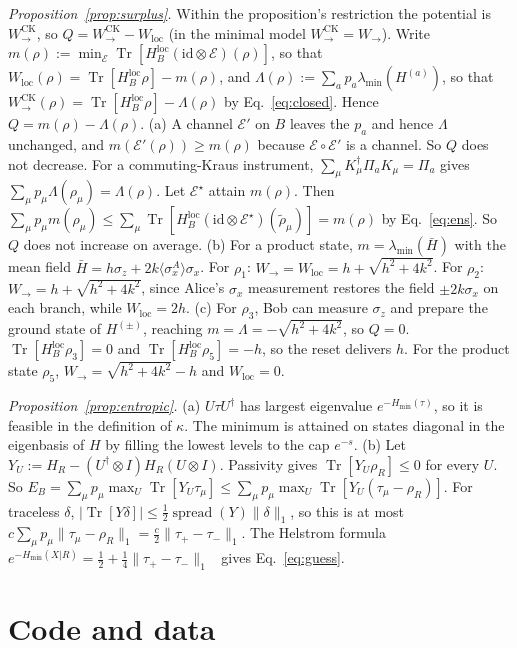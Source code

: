 \documentclass[aps,pra,twocolumn,reprint,superscriptaddress,nofootinbib,floatfix]{revtex4-2}
\theoremstyle{plain}
\theoremstyle{remark}
\newcommand{\Tr}{\operatorname{Tr}}
\newcommand{\id}{\mathrm{id}}
\newcommand{\Wto}{W_{\to}}
\newcommand{\WCK}{W_{\to}^{\mathrm{CK}}}
\newcommand{\Wloc}{W_{\mathrm{loc}}}
\newcommand{\HBl}{H_B^{\mathrm{loc}}}
\newcommand{\E}{\mathcal{E}}
\newcommand{\lmin}{\lambda_{\min}}
\newcommand{\Hmin}{H_{\min}}
\newcommand{\spread}{\operatorname{spread}}
\begin{document}
\emph{Proposition~\ref{prop:surplus}.} Within the proposition's restriction the potential is
$\WCK$, so $Q=\WCK-\Wloc$ (in the minimal model $\WCK=\Wto$). Write
$m(\rho):=\min_\E\Tr[\HBl(\id\otimes\E)(\rho)]$, so that $\Wloc(\rho)=\Tr[\HBl\rho]-m(\rho)$,
and $\Lambda(\rho):=\sum_ap_a\lmin(H^{(a)})$, so that $\WCK(\rho)=\Tr[\HBl\rho]-\Lambda(\rho)$
by Eq.~\eqref{eq:closed}. Hence $Q=m(\rho)-\Lambda(\rho)$.
(a) A channel $\E'$ on $B$ leaves the $p_a$ and hence $\Lambda$ unchanged, and
$m(\E'(\rho))\ge m(\rho)$ because $\E\circ\E'$ is a channel. So $Q$ does not decrease. For a
commuting-Kraus instrument, $\sum_\mu K_\mu^\dagger\Pi_aK_\mu=\Pi_a$ gives
$\sum_\mu p_\mu\Lambda(\rho_\mu)=\Lambda(\rho)$. Let $\E^\star$ attain $m(\rho)$. Then
$\sum_\mu p_\mu m(\rho_\mu)\le\sum_\mu\Tr[\HBl(\id\otimes\E^\star)(\tilde\rho_\mu)]=m(\rho)$
by Eq.~\eqref{eq:ens}. So $Q$ does not increase on average.
(b) For a product state, $m=\lmin(\bar H)$ with the mean field
$\bar H=h\sigma_z+2k\langle\sigma_x^A\rangle\sigma_x$. For $\rho_1$: $\Wto=\Wloc=h+\sqrt{h^2+4k^2}$.
For $\rho_2$: $\Wto=h+\sqrt{h^2+4k^2}$, since Alice's $\sigma_x$ measurement restores the
field $\pm2k\sigma_x$ on each branch, while $\Wloc=2h$.
(c) For $\rho_3$, Bob can measure $\sigma_z$ and prepare the ground state of $H^{(\pm)}$,
reaching $m=\Lambda=-\sqrt{h^2+4k^2}$, so $Q=0$. $\Tr[\HBl\rho_3]=0$ and
$\Tr[\HBl\rho_5]=-h$, so the reset delivers $h$. For the product state $\rho_5$,
$\Wto=\sqrt{h^2+4k^2}-h$ and $\Wloc=0$.

\emph{Proposition~\ref{prop:entropic}.} (a) $U\tau U^\dagger$ has largest eigenvalue
$e^{-\Hmin(\tau)}$, so it is feasible in the definition of $\kappa$. The minimum is attained
on states diagonal in the eigenbasis of $H$ by filling the lowest levels to the cap
$e^{-s}$. (b) Let $Y_U:=H_R-(U^\dagger\otimes I)H_R(U\otimes I)$. Passivity gives
$\Tr[Y_U\rho_R]\le0$ for every $U$. So
$E_B=\sum_\mu p_\mu\max_U\Tr[Y_U\tau_\mu]\le\sum_\mu p_\mu\max_U\Tr[Y_U(\tau_\mu-\rho_R)]$.
For traceless $\delta$, $|\Tr[Y\delta]|\le\tfrac12\spread(Y)\|\delta\|_1$, so this is at most
$c\sum_\mu p_\mu\|\tau_\mu-\rho_R\|_1=\tfrac c2\|\tau_+-\tau_-\|_1$. The Helstrom formula
$e^{-\Hmin(X|R)}=\tfrac12+\tfrac14\|\tau_+-\tau_-\|_1$~\cite{KRS2009} gives Eq.~\eqref{eq:guess}.

\section{Code and data}
\label{app:code}
\end{document}
